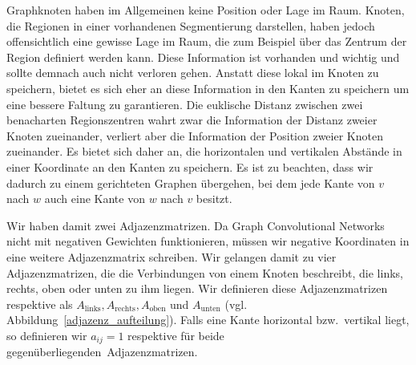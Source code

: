 Graphknoten haben im Allgemeinen keine Position oder Lage im Raum.
Knoten, die Regionen in einer vorhandenen Segmentierung darstellen, haben jedoch offensichtlich eine gewisse Lage im Raum, die zum Beispiel über das Zentrum der Region definiert werden kann.
Diese Information ist vorhanden und wichtig und sollte demnach auch nicht verloren gehen.
Anstatt diese lokal im Knoten zu speichern, bietet es sich eher an diese Information in den Kanten zu speichern um eine bessere Faltung zu garantieren.
Die euklische Distanz zwischen zwei benacharten Regionszentren wahrt zwar die Information der Distanz zweier Knoten zueinander, verliert aber die Information der Position zweier Knoten zueinander.
Es bietet sich daher an, die horizontalen und vertikalen Abstände in einer Koordinate an den Kanten zu speichern.
Es ist zu beachten, dass wir dadurch zu einem gerichteten Graphen übergehen, bei dem jede Kante von $v$ nach $w$ auch eine Kante von $w$ nach $v$ besitzt.

Wir haben damit zwei Adjazenzmatrizen.
Da Graph Convolutional Networks nicht mit negativen Gewichten funktionieren, müssen wir negative Koordinaten in eine weitere Adjazenzmatrix schreiben.
Wir gelangen damit zu vier Adjazenzmatrizen, die die Verbindungen von einem Knoten beschreibt, die links, rechts, oben oder unten zu ihm liegen.
Wir definieren diese Adjazenzmatrizen respektive als $A_{\text{links}}, A_{\text{rechts}}, A_{\text{oben}}$ und $A_{\text{unten}}$ (vgl. Abbildung~\ref{adjazenz_aufteilung}).
Falls eine Kante horizontal bzw.\ vertikal liegt, so definieren wir $a_{ij} = 1$ respektive für beide \glqq{}gegenüberliegenden\grqq\ Adjazenzmatrizen.


